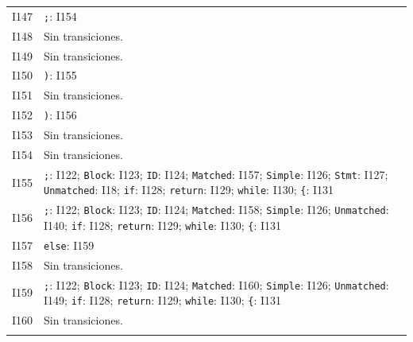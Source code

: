 {\begin{longtable}{@{}r p{14.7cm}@{}}
I147 & \texttt{;}: I154\\\addlinespace[3pt]
I148 & Sin transiciones.\\\addlinespace[3pt]
I149 & Sin transiciones.\\\addlinespace[3pt]
I150 & \texttt{)}: I155\\\addlinespace[3pt]
I151 & Sin transiciones.\\\addlinespace[3pt]
I152 & \texttt{)}: I156\\\addlinespace[3pt]
I153 & Sin transiciones.\\\addlinespace[3pt]
I154 & Sin transiciones.\\\addlinespace[3pt]
I155 & \texttt{;}: I122; \texttt{Block}: I123; \texttt{ID}: I124; \texttt{Matched}: I157; \texttt{Simple}: I126; \texttt{Stmt}: I127; \texttt{Unmatched}: I18; \texttt{if}: I128; \texttt{return}: I129; \texttt{while}: I130; \texttt{\{}: I131\\\addlinespace[3pt]
I156 & \texttt{;}: I122; \texttt{Block}: I123; \texttt{ID}: I124; \texttt{Matched}: I158; \texttt{Simple}: I126; \texttt{Unmatched}: I140; \texttt{if}: I128; \texttt{return}: I129; \texttt{while}: I130; \texttt{\{}: I131\\\addlinespace[3pt]
I157 & \texttt{else}: I159\\\addlinespace[3pt]
I158 & Sin transiciones.\\\addlinespace[3pt]
I159 & \texttt{;}: I122; \texttt{Block}: I123; \texttt{ID}: I124; \texttt{Matched}: I160; \texttt{Simple}: I126; \texttt{Unmatched}: I149; \texttt{if}: I128; \texttt{return}: I129; \texttt{while}: I130; \texttt{\{}: I131\\\addlinespace[3pt]
I160 & Sin transiciones.\\\addlinespace[3pt]
\bottomrule\end{longtable}}